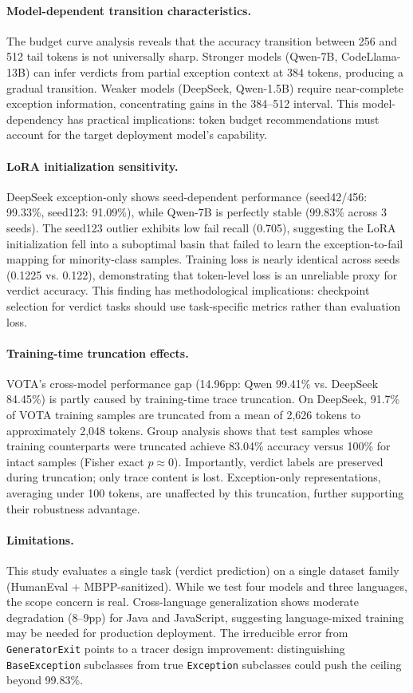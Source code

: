 \documentclass[11pt,a4paper]{article}
\begin{document}
\paragraph{Model-dependent transition characteristics.}
The budget curve analysis reveals that the accuracy transition between 256 and 512 tail tokens is not universally sharp. Stronger models (Qwen-7B, CodeLlama-13B) can infer verdicts from partial exception context at 384 tokens, producing a gradual transition. Weaker models (DeepSeek, Qwen-1.5B) require near-complete exception information, concentrating gains in the 384--512 interval. This model-dependency has practical implications: token budget recommendations must account for the target deployment model's capability.

\paragraph{LoRA initialization sensitivity.}
DeepSeek exception-only shows seed-dependent performance (seed42/456: 99.33\%, seed123: 91.09\%), while Qwen-7B is perfectly stable (99.83\% across 3 seeds). The seed123 outlier exhibits low fail recall (0.705), suggesting the LoRA initialization fell into a suboptimal basin that failed to learn the exception-to-fail mapping for minority-class samples. Training loss is nearly identical across seeds (0.1225 vs. 0.122), demonstrating that token-level loss is an unreliable proxy for verdict accuracy. This finding has methodological implications: checkpoint selection for verdict tasks should use task-specific metrics rather than evaluation loss.

\paragraph{Training-time truncation effects.}
VOTA's cross-model performance gap (14.96pp: Qwen 99.41\% vs. DeepSeek 84.45\%) is partly caused by training-time trace truncation. On DeepSeek, 91.7\% of VOTA training samples are truncated from a mean of 2,626 tokens to approximately 2,048 tokens. Group analysis shows that test samples whose training counterparts were truncated achieve 83.04\% accuracy versus 100\% for intact samples (Fisher exact $p \approx 0$). Importantly, verdict labels are preserved during truncation; only trace content is lost. Exception-only representations, averaging under 100 tokens, are unaffected by this truncation, further supporting their robustness advantage.

\paragraph{Limitations.}
This study evaluates a single task (verdict prediction) on a single dataset family (HumanEval + MBPP-sanitized). While we test four models and three languages, the scope concern is real. Cross-language generalization shows moderate degradation (8--9pp) for Java and JavaScript, suggesting language-mixed training may be needed for production deployment. The irreducible error from \texttt{GeneratorExit} points to a tracer design improvement: distinguishing \texttt{BaseException} subclasses from true \texttt{Exception} subclasses could push the ceiling beyond 99.83\%.
\end{document}
